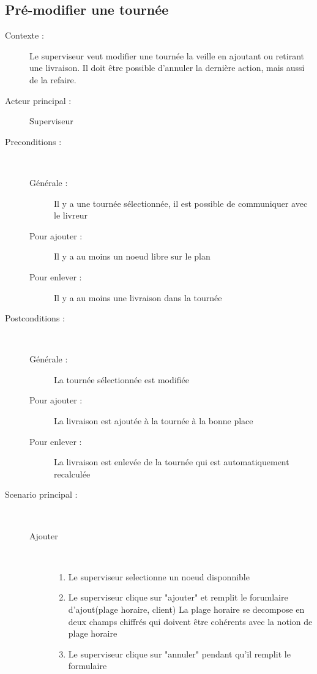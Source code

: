 \subsection{Pr\'e-modifier une tourn\'ee}
\begin{description}
    \item[Contexte :] Le superviseur veut modifier une tourn\'ee la veille en ajoutant ou retirant une livraison. Il doit \^etre possible d'annuler la derni\`ere action, mais aussi de la refaire.
    \item[Acteur principal :] Superviseur
    \item[Preconditions :] ~
    \begin{description}
        \item[G\'en\'erale :] Il y a une tourn\'ee s\'electionn\'ee, il est possible de communiquer avec le livreur
        \item[Pour ajouter :] Il y a au moins un noeud libre sur le plan
        \item[Pour enlever :] Il y a au moins une livraison dans la tourn\'ee
    \end{description}
    \item[Postconditions :] ~
    \begin{description}
        \item[G\'en\'erale :] La tourn\'ee s\'electionn\'ee est modifi\'ee
        \item[Pour ajouter :] La livraison est ajout\'ee \`a la tourn\'ee \`a la bonne place
        \item[Pour enlever :] La livraison est enlev\'ee de la tourn\'ee qui est automatiquement recalcul\'ee
    \end{description}
    \item[Scenario principal :] ~
    \begin{description}
        \item[Ajouter] ~
        \begin{enumerate}
            \item Le superviseur selectionne un noeud disponnible
            \item Le superviseur clique sur "ajouter" et remplit le forumlaire d'ajout(plage horaire, client) La plage horaire se decompose en deux champs chiffr\'es qui doivent \^etre coh\'erents avec la notion de plage horaire
            \item Le superviseur clique sur "annuler" pendant qu'il remplit le formulaire
            \begin{enumerate}

\end{enumerate}
\end{enumerate}
\end{description}
\end{description}
